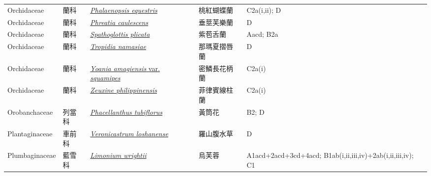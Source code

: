 {\begin{longtable}{p{2.5cm}p{2.5cm}p{4.5cm}p{2.5cm}p{3cm}}
    Orchidaceae & 蘭科 & \href{http://www.theplantlist.org/tpl1.1/search?q=Phalaenopsis+equestris}{\textit{Phalaenopsis equestris} } & 桃紅蝴蝶蘭 & C2a(i,ii); D \index{Phalaenopsis@\textit{Phalaenopsis}!equestris@\textit{equestris}}  \index{桃紅蝴蝶蘭} \\
    Orchidaceae & 蘭科 & \href{http://www.theplantlist.org/tpl1.1/search?q=Phreatia+caulescens}{\textit{Phreatia caulescens} } & 垂莖芙樂蘭 & D \index{Phreatia@\textit{Phreatia}!caulescens@\textit{caulescens}}  \index{垂莖芙樂蘭} \\
    Orchidaceae & 蘭科 & \href{http://www.theplantlist.org/tpl1.1/search?q=Spathoglottis+plicata}{\textit{Spathoglottis plicata} } & 紫苞舌蘭 & Aacd; B2a \index{Spathoglottis@\textit{Spathoglottis}!plicata@\textit{plicata}}  \index{紫苞舌蘭} \\
    Orchidaceae & 蘭科 & \href{http://www.theplantlist.org/tpl1.1/search?q=Tropidia+namasiae}{\textit{Tropidia namasiae} } & 那瑪夏摺唇蘭 & D \index{Tropidia@\textit{Tropidia}!namasiae@\textit{namasiae}}  \index{那瑪夏摺唇蘭} \\
    Orchidaceae & 蘭科 & \href{http://www.theplantlist.org/tpl1.1/search?q=Yoania+amagiensis+var.+squamipes}{\textit{Yoania amagiensis} var. \textit{squamipes} } & 密鱗長花柄蘭 & C2a(i) \index{Yoania@\textit{Yoania}!amagiensis@\textit{amagiensis}!var. squamipes@var. \textit{squamipes}}  \index{密鱗長花柄蘭} \\
    Orchidaceae & 蘭科 & \href{http://www.theplantlist.org/tpl1.1/search?q=Zeuxine+philippinensis}{\textit{Zeuxine philippinensis} } & 菲律賓線柱蘭 & C2a(i) \index{Zeuxine@\textit{Zeuxine}!philippinensis@\textit{philippinensis}}  \index{菲律賓線柱蘭} \\
    Orobanchaceae & 列當科 & \href{http://www.theplantlist.org/tpl1.1/search?q=Phacellanthus+tubiflorus}{\textit{Phacellanthus tubiflorus} } & 黃筒花 & B2; D \index{Phacellanthus@\textit{Phacellanthus}!tubiflorus@\textit{tubiflorus}}  \index{黃筒花} \\
    Plantaginaceae & 車前科 & \href{http://www.theplantlist.org/tpl1.1/search?q=Veronicastrum+loshanense}{\textit{Veronicastrum loshanense} } & 羅山腹水草 & D \index{Veronicastrum@\textit{Veronicastrum}!loshanense@\textit{loshanense}}  \index{羅山腹水草} \\
    Plumbaginaceae & 藍雪科 & \href{http://www.theplantlist.org/tpl1.1/search?q=Limonium+wrightii}{\textit{Limonium wrightii} } & 烏芙蓉 & A1acd+2acd+3cd+4acd; B1ab(i,ii,iii,iv)+2ab(i,ii,iii,iv); C1 \index{Limonium@\textit{Limonium}!wrightii@\textit{wrightii}}  \index{烏芙蓉} \\

\end{longtable}}
